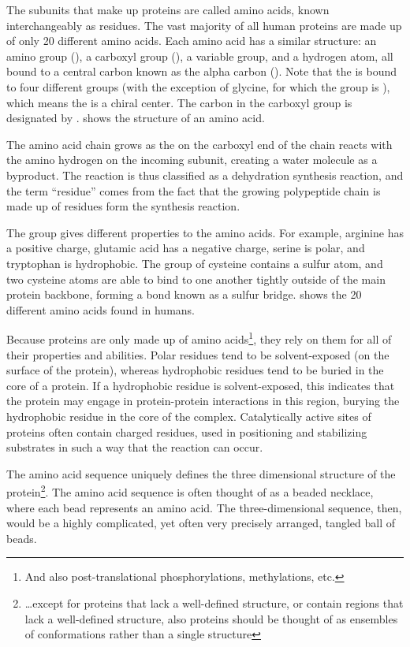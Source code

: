 The subunits that make up proteins are called amino acids, known interchangeably as residues. The vast majority of all human proteins are made up of only 20 different amino acids. Each amino acid has a similar structure: an amino group (), a carboxyl group (), a variable  group, and a hydrogen atom, all bound to a central carbon known as the alpha carbon (). Note that the  is bound to four different groups (with the exception of glycine, for which the  group is ), which means the  is a chiral center. The carbon in the carboxyl group is designated by .  shows the structure of an amino acid.

The amino acid chain grows as the  on the carboxyl end of the chain reacts with the amino hydrogen on the incoming subunit, creating a water molecule as a byproduct. The reaction is thus classified as a dehydration synthesis reaction, and the term ``residue'' comes from the fact that the growing polypeptide chain is made up of residues form the synthesis reaction.

The  group gives different properties to the amino acids. For example, arginine has a positive charge, glutamic acid has a negative charge, serine is polar, and tryptophan is hydrophobic. The  group of cysteine contains a sulfur atom, and two cysteine atoms are able to bind to one another tightly outside of the main protein backbone, forming a bond known as a sulfur bridge.  shows the \num{20} different amino acids found in humans.

Because proteins are only made up of amino acids\footnote{And also post-translational phosphorylations, methylations, etc.}, they rely on them for all of their properties and abilities. Polar residues tend to be solvent-exposed (on the surface of the protein), whereas hydrophobic residues tend to be buried in the core of a protein. If a hydrophobic residue is solvent-exposed, this indicates that the protein may engage in protein-protein interactions in this region, burying the hydrophobic residue in the core of the complex. Catalytically active sites of proteins often contain charged residues, used in positioning and stabilizing substrates in such a way that the reaction can occur.

The amino acid sequence uniquely defines the three dimensional structure of the protein\footnote{\dots except for proteins that lack a well-defined structure, or contain regions that lack a well-defined structure, also proteins should be thought of as ensembles of conformations rather than a single structure}. The amino acid sequence is often thought of as a beaded necklace, where each bead represents an amino acid. The three-dimensional sequence, then, would be a highly complicated, yet often very precisely arranged, tangled ball of beads.

